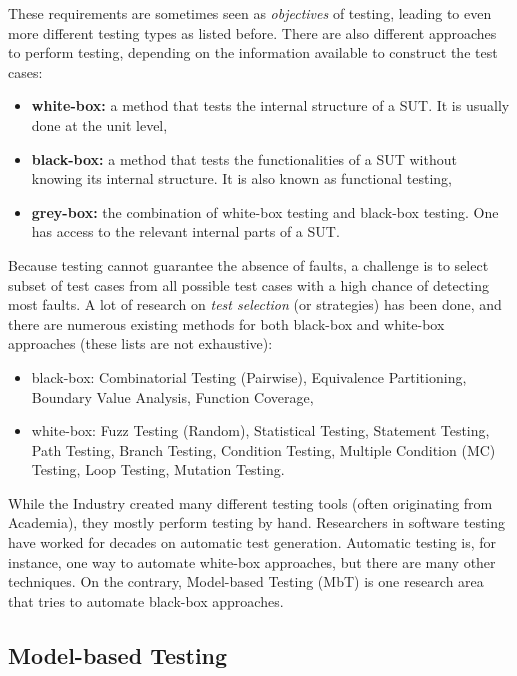 These requirements are sometimes seen as \textit{objectives} of
testing, leading to even more different testing types as listed
before. There are also different approaches to perform testing,
depending on the information available to construct the test
cases:

\begin{itemize}
\item \textbf{white-box:} a method that tests the internal
structure of a SUT. It is usually done at the unit level,

\item \textbf{black-box:} a method that tests the functionalities
of a SUT without knowing its internal structure.  It is also
known as functional testing,

\item \textbf{grey-box:} the combination of white-box testing and
black-box testing. One has access to the relevant internal parts
of a SUT.
\end{itemize}

Because testing cannot guarantee the absence of faults, a
challenge is to select subset of test cases from all possible
test cases with a high chance of detecting most faults. A lot of
research on \textit{test selection} (or strategies) has been
done, and there are numerous existing methods for both black-box
and white-box approaches (these lists are not exhaustive):

\begin{itemize}
\item black-box: Combinatorial Testing (Pairwise), Equivalence
Partitioning, Boundary Value Analysis, Function Coverage,

\item white-box: Fuzz Testing (Random), Statistical Testing,
Statement Testing, Path Testing, Branch Testing, Condition
Testing, Multiple Condition (MC) Testing, Loop Testing, Mutation
Testing.
\end{itemize}

While the Industry created many different testing tools (often
originating from Academia), they mostly perform testing by hand.
Researchers in software testing have worked for decades on
automatic test generation. Automatic testing is, for instance,
one way to automate white-box approaches, but there are many
other techniques. On the contrary, Model-based Testing (MbT) is
one research area that tries to automate black-box approaches.

\subsection{Model-based Testing}

